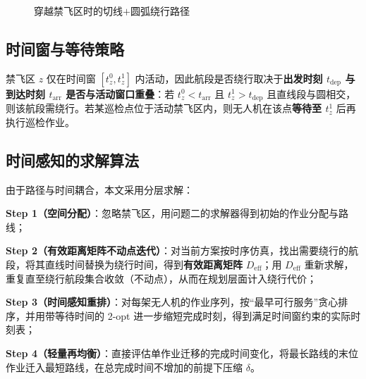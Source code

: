 \documentclass[12pt,a4paper]{ctexart}
\begin{document}
\begin{figure}[H]
  \centering
  \caption{穿越禁飞区时的切线$+$圆弧绕行路径}
  \label{fig:detour}
\end{figure}

\subsection{时间窗与等待策略}

禁飞区 $z$ 仅在时间窗 $[t_z^0,t_z^1]$ 内活动，因此航段是否绕行取决于\textbf{出发时刻 $t_{\mathrm{dep}}$ 与到达时刻 $t_{\mathrm{arr}}$ 是否与活动窗口重叠}：若 $t_z^0 < t_{\mathrm{arr}}$ 且 $t_z^1 > t_{\mathrm{dep}}$ 且直线段与圆相交，则该航段需绕行。若某巡检点位于活动禁飞区内，则无人机在该点\textbf{等待至 $t_z^1$} 后再执行巡检作业。

\subsection{时间感知的求解算法}

由于路径与时间耦合，本文采用分层求解：

\textbf{Step 1（空间分配）}：忽略禁飞区，用问题二的求解器得到初始的作业分配与路线；

\textbf{Step 2（有效距离矩阵不动点迭代）}：对当前方案按时序仿真，找出需要绕行的航段，将其直线时间替换为绕行时间，得到\textbf{有效距离矩阵} $D_{\mathrm{eff}}$；用 $D_{\mathrm{eff}}$ 重新求解，重复直至绕行航段集合收敛（不动点），从而在规划层面计入绕行代价；

\textbf{Step 3（时间感知重排）}：对每架无人机的作业序列，按``最早可行服务''贪心排序，并用带等待时间的 2-opt 进一步缩短完成时刻，得到满足时间窗约束的实际时刻表；

\textbf{Step 4（轻量再均衡）}：直接评估单作业迁移的完成时间变化，将最长路线的末位作业迁入最短路线，在总完成时间不增加的前提下压缩 $\delta$。
\end{document}
